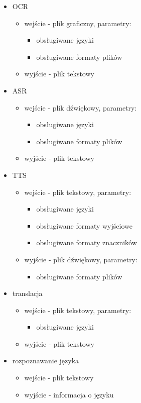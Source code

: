 \begin{itemize}
	\item OCR
	\begin{itemize}
		\item wejście - plik graficzny, parametry:
		\begin{itemize}
			\item obsługiwane języki 
			\item obsługiwane formaty plików
		\end{itemize}
		\item wyjście - plik tekstowy
	\end{itemize}
	\item ASR
	\begin{itemize}
		\item wejście - plik dźwiękowy, parametry:
		\begin{itemize}
			\item obsługiwane języki 
			\item obsługiwane formaty plików
		\end{itemize}
		\item wyjście - plik tekstowy
	\end{itemize}
	\item TTS
	\begin{itemize}
		\item wejście - plik tekstowy, parametry:
		\begin{itemize}
			\item obsługiwane języki 
			\item obsługiwane formaty wyjściowe
			\item obsługiwane formaty znaczników
		\end{itemize}
		\item wyjście - plik dźwiękowy, parametry:
		\begin{itemize}
			\item obsługiwane formaty plików
		\end{itemize}
	\end{itemize}
	\item translacja
	\begin{itemize}
		\item wejście - plik tekstowy, parametry:
		\begin{itemize}
			\item obsługiwane języki 
		\end{itemize}
		\item wyjście - plik tekstowy
	\end{itemize}
	\item rozpoznawanie języka
	\begin{itemize}
		\item wejście - plik tekstowy
		\item wyjście - informacja o języku
	\end{itemize}
\end{itemize}

